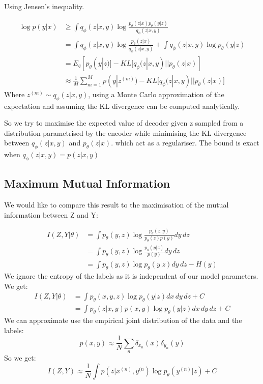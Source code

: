\documentclass[10pt,oneside,openright]{report}
\begin{document}
Using Jensen's inequality.

\begin{align}
 \log p(y|x) & \geq \int q_\phi(z|x, y) \log \frac{p_\theta(z|x) p_\theta(y| z)}{q_\phi(z|x, y)} \\
  &= \int q_\phi(z|x, y) \log \frac{p_\theta(z|x)}{q_\phi(z|x, y)}  + \int q_\phi(z|x, y) \log p_\theta(y|z) \\
  &= E_q[p_\theta(y|z)] - KL\big[q_\phi(z|x, y) || p_\theta(z|x)]\\
  &\approx  \frac{1}{M} \sum^M_{m=1} p(y | z^{(m)}) - KL\big[q_\phi(z|x, y) || p_\theta(z|x)\big]
\end{align}
Where $ z^{(m)} \sim q_\phi(z|x, y)$, using a Monte Carlo approximation of the expectation and assuming the KL divergence can be computed analytically.

So we try to maximise the expected value of decoder given z sampled from a distribution parametrised by the encoder while minimising the KL divergence between $q_\phi(z|x, y)$ and $p_\theta(z|x)$. which act as a regulariser. The bound is exact when $q_\phi(z| x, y) = p(z|x, y)$

\subsection{Maximum Mutual Information}

We would like to compare this result to the maximisation of the  mutual information between Z and Y:

\begin{align}
I(Z, Y|\theta) &= \int p_\theta(y, z) \log \frac{p_\theta(z, y)}{p_\theta(z)p(y)} dy\,dz\\
& = \int p_\theta(y, z) \log \frac{p_\theta(y|z)}{p(y)} dy\,dz\\
&= \int p_\theta(y, z) \log p_\theta(y|z) dy\,dz - H(y) 
\end{align}
We ignore the entropy of the labels as it is independent of our model parameters. We get:
\begin{align}
I(Z, Y|\theta) &= \int p_\theta(x, y, z) \log p_\theta(y| z) dx\,dy\,dz + C\\
&= \int p_\theta(z | x, y) p(x, y) \log p_\theta(y | z) dx\,dy\,dz + C
\end{align}
We can approximate use the empirical joint distribution of the data and the labels:
$$ p(x, y) \approx \frac{1}{N}\sum_n \delta_{x_n}(x) \delta_{y_n}(y)$$
So we get:
$$ I(Z, Y) \approx \frac{1}{N} \int p(z | x^{(n)}, y^{(n}) \log p_\theta(y^{(n)} | z) + C$$
\end{document}
